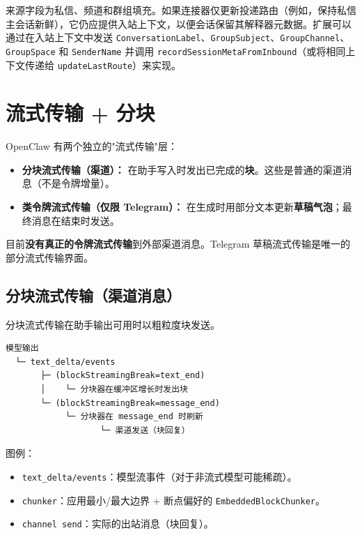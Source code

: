 来源字段为私信、频道和群组填充。如果连接器仅更新投递路由（例如，保持私信主会话新鲜），它仍应提供入站上下文，以便会话保留其解释器元数据。扩展可以通过在入站上下文中发送 \texttt{ConversationLabel}、\texttt{GroupSubject}、\texttt{GroupChannel}、\texttt{GroupSpace} 和 \texttt{SenderName} 并调用 \texttt{recordSessionMetaFromInbound}（或将相同上下文传递给 \texttt{updateLastRoute}）来实现。


\clearpage

\section{流式传输 + 分块}


OpenClaw 有两个独立的"流式传输"层：

\begin{itemize}
  \item \textbf{分块流式传输（渠道）：} 在助手写入时发出已完成的\textbf{块}。这些是普通的渠道消息（不是令牌增量）。
  \item \textbf{类令牌流式传输（仅限 Telegram）：} 在生成时用部分文本更新\textbf{草稿气泡}；最终消息在结束时发送。
\end{itemize}


目前\textbf{没有真正的令牌流式传输}到外部渠道消息。Telegram 草稿流式传输是唯一的部分流式传输界面。

\subsection{分块流式传输（渠道消息）}


分块流式传输在助手输出可用时以粗粒度块发送。

\begin{lstlisting}
模型输出
  └─ text_delta/events
       ├─ (blockStreamingBreak=text_end)
       │    └─ 分块器在缓冲区增长时发出块
       └─ (blockStreamingBreak=message_end)
            └─ 分块器在 message_end 时刷新
                   └─ 渠道发送（块回复）
\end{lstlisting}


图例：

\begin{itemize}
  \item \texttt{text\_delta/events}：模型流事件（对于非流式模型可能稀疏）。
  \item \texttt{chunker}：应用最小/最大边界 + 断点偏好的 \texttt{EmbeddedBlockChunker}。
  \item \texttt{channel send}：实际的出站消息（块回复）。
\end{itemize}


